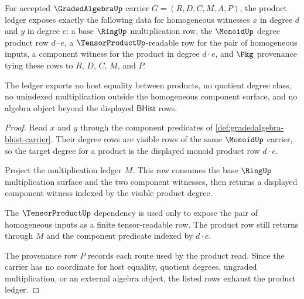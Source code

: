 \begin{theorem}
\label{thm:gradedalgebra-product-ledger}
For accepted $\GradedAlgebraUp$ carrier $G=(R,D,C,M,A,P)$, the product ledger exposes exactly the following data for homogeneous witnesses $x$ in degree $d$ and $y$ in degree $e$: a base $\RingUp$ multiplication row, the $\MonoidUp$ degree product row $d\cdot e$, a $\TensorProductUp$-readable row for the pair of homogeneous inputs, a component witness for the product in degree $d\cdot e$, and $\Pkg$ provenance tying these rows to $R$, $D$, $C$, $M$, and $P$.

The ledger exports no host equality between products, no quotient degree class, no unindexed multiplication outside the homogeneous component surface, and no algebra object beyond the displayed $\mathsf{BHist}$ rows.
\end{theorem}
\begin{proof}
Read $x$ and $y$ through the component predicates of \autoref{def:gradedalgebra-bhist-carrier}. Their degree rows are visible rows of the same $\MonoidUp$ carrier, so the target degree for a product is the displayed monoid product row $d\cdot e$.

Project the multiplication ledger $M$. This row consumes the base $\RingUp$ multiplication surface and the two component witnesses, then returns a displayed component witness indexed by the visible product degree.

The $\TensorProductUp$ dependency is used only to expose the pair of homogeneous inputs as a finite tensor-readable row. The product row still returns through $M$ and the component predicate indexed by $d\cdot e$.

The provenance row $P$ records each route used by the product read. Since the carrier has no coordinate for host equality, quotient degrees, ungraded multiplication, or an external algebra object, the listed rows exhaust the product ledger.
\end{proof}

